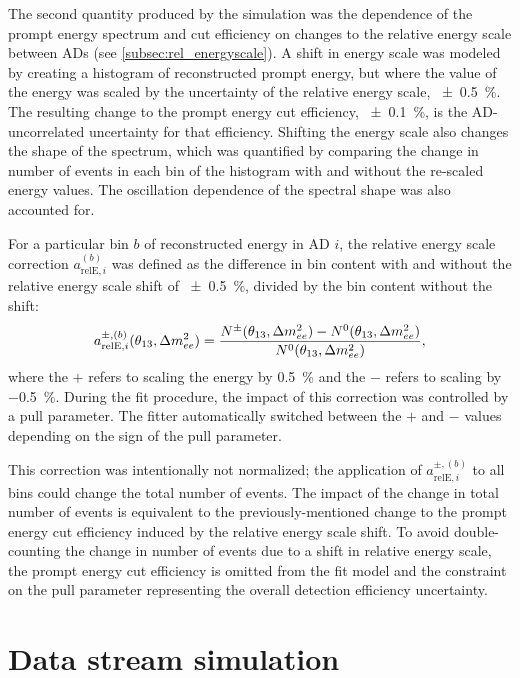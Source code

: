 The second quantity produced by the simulation
was the dependence of the prompt energy spectrum and cut efficiency
on changes to the relative energy scale between ADs (see \cref{subsec:rel_energyscale}).
A shift in energy scale was modeled by
creating a histogram of reconstructed prompt energy,
but where the value of the energy was scaled
by the uncertainty of the relative energy scale, \SI{\pm0.5}{\percent}.
The resulting change to the prompt energy cut efficiency, \SI{\pm0.1}{\percent},
is the AD-uncorrelated uncertainty for that efficiency.
Shifting the energy scale also changes the shape of the spectrum,
which was quantified by comparing the change in number of events
in each bin of the histogram with and without the re-scaled energy values.
The oscillation dependence of the spectral shape was also accounted for.

For a particular bin $b$ of reconstructed energy in AD $i$,
the relative energy scale correction $a_{\text{relE},i}^{(b)}$
was defined as the difference in bin content with and without
the relative energy scale shift of \SI{\pm0.5}{\percent},
divided by the bin content without the shift:
\begin{equation}
    a_{\text{relE},i}^{\pm,(b)}(\thetaot, \dmee) =
    \frac{N^\pm(\thetaot, \dmee) - N^0(\thetaot, \dmee)}%
    {N^0(\thetaot, \dmee)},
\end{equation}
where the $+$ refers to scaling the energy by \SI[retain-explicit-plus]{+0.5}{\percent}
and the $-$ refers to scaling by \SI{-0.5}{\percent}.
During the fit procedure, the impact of this correction
was controlled by a pull parameter.
The fitter automatically switched between the $+$ and $-$ values
depending on the sign of the pull parameter.

This correction was intentionally not normalized;
the application of $a_{\text{relE},i}^{\pm,(b)}$ to all bins
could change the total number of events.
The impact of the change in total number of events
is equivalent to the previously-mentioned change
to the prompt energy cut efficiency induced by the relative energy scale shift.
To avoid double-counting the change in number of events
due to a shift in relative energy scale,
the prompt energy cut efficiency is omitted
from the fit model and the constraint
on the pull parameter representing the overall detection efficiency uncertainty.

\section{Data stream simulation}
\label{sec:toymc}

